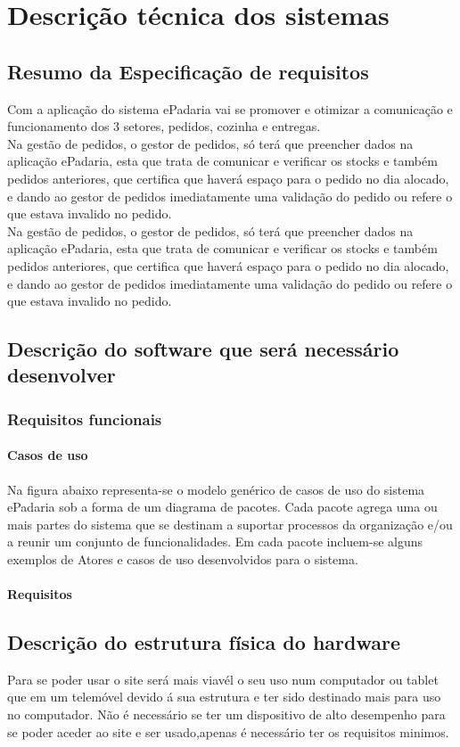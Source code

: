 \chapter{Descrição técnica dos sistemas}
\label{descricao_tecnica_dos_sistemas}

\section{Resumo da Especificação de requisitos}
Com a aplicação do sistema ePadaria vai se promover e otimizar a comunicação e funcionamento dos 3 setores, pedidos, cozinha e entregas.\\
Na gestão de pedidos, o gestor de pedidos, só terá que preencher dados na aplicação ePadaria, esta que trata de comunicar e verificar os stocks e também pedidos anteriores, que certifica que haverá espaço para o pedido no dia alocado, e dando ao gestor de pedidos imediatamente uma validação do pedido ou
refere o que estava invalido no pedido.\\
Na gestão de pedidos, o gestor de pedidos, só terá que preencher dados na aplicação ePadaria, esta que trata de comunicar e verificar os stocks e também pedidos anteriores, que certifica que haverá espaço para o pedido no dia alocado, e dando ao gestor de pedidos imediatamente uma validação do pedido ou refere o que estava invalido no pedido.\\

\section{Descrição do software que será necessário desenvolver}
\subsection{Requisitos funcionais}
\subsubsection{Casos de uso}
Na figura abaixo representa-se o modelo genérico de casos de uso do sistema ePadaria sob a forma de um diagrama de pacotes. Cada pacote agrega uma ou mais partes do sistema que se destinam a suportar processos da organização e/ou a reunir um conjunto de funcionalidades. Em cada pacote incluem-se alguns exemplos de Atores e casos de uso desenvolvidos para o sistema.

\subsubsection{Requisitos}
\section{Descrição do estrutura física do hardware}
Para se poder usar o site será mais viavél o seu uso num computador ou tablet que em um telemóvel devido á sua estrutura e ter sido destinado mais para uso no computador. 
Não é necessário se ter um dispositivo de alto desempenho para se poder aceder ao site e ser usado,apenas é necessário ter os requisitos minimos.